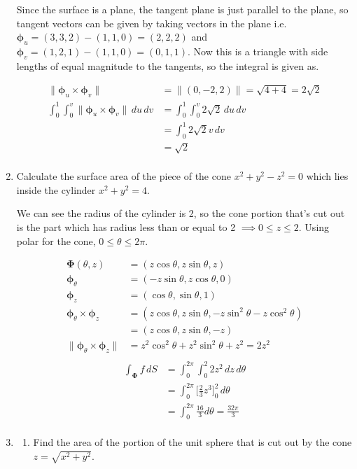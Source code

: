 \documentclass{article}
\newcommand{\norm}[1]{\| #1 \|}
\begin{document}
\begin{enumerate}
    Since the surface is a plane, the tangent plane is just parallel to the plane, so tangent vectors can be given by taking vectors in the plane i.e. $\boldsymbol \phi_u = (3,3,2) - (1,1,0) = (2,2,2)$ and $\boldsymbol \phi_v = (1,2,1) - (1,1,0) = (0,1,1)$. Now this is a triangle with side lengths of equal magnitude to the tangents, so the integral is given as.

    \begin{align*}
        \norm{\boldsymbol \phi_u \times \boldsymbol \phi_v} &= \norm{(0,-2,2)} = \sqrt{4 + 4} = 2 \sqrt2 \\
        \int_0^1 \int_0^v \norm{\boldsymbol \phi_u \times \boldsymbol \phi_v} \, du \, dv &= \int_0^1 \int_0^v 2\sqrt2 \,du \, dv \\
        &= \int_0^1 2\sqrt2v \, dv \\
        &= \sqrt2 \\
    \end{align*}
    \newpage
    \item Calculate the surface area of the piece of the cone $x^2+y^2-z^2 =0$ which lies inside the cylinder $x^2 + y^2 = 4$.
    
    We can see the radius of the cylinder is 2, so the cone portion that's cut out is the part which has radius less than or equal to 2 $\implies 0 \leq z \leq 2$. Using polar for the cone, $0 \leq \theta \leq 2 \pi$.
    \begin{multicols}{2}
    \noindent
    \begin{align*}
        \boldsymbol \Phi (\theta, z) &= (z\cos \theta, z\sin \theta, z) \\
        \boldsymbol \phi_\theta &= (- z \sin \theta, z \cos \theta, 0) \\
        \boldsymbol \phi_z &= ( \cos \theta, \sin \theta, 1) \\
        \boldsymbol \phi_\theta \times \boldsymbol \phi_z &= (z \cos \theta, z \sin \theta, - z \sin^2 \theta - z \cos^2 \theta) \\
        &= (z \cos \theta, z \sin \theta, - z)  \\
        \norm {\boldsymbol \phi_\theta \times \boldsymbol \phi_z }&= z^2 \cos^2 \theta + z^2 \sin^2 \theta + z^2  = 2 z^2\\
    \end{align*}
    \begin{align*}
        \int_{\boldsymbol \Phi} f \, dS &= \int_0^{2\pi} \int_0^2 2z^2 \, dz \, d\theta \\
        &= \int_0^{2\pi} \Big[ \frac{2}{3}z^3\Big]_0^2 \, d\theta \\
        &= \int_0^{2\pi} \frac{16}{3} d\theta =\frac{32\pi}{3} \\
    \end{align*}
    \end{multicols}
    \newpage
    \item
    \begin{enumerate}
        \item Find the area of the portion of the unit sphere that is cut out by the cone $z = \sqrt{x^2+y^2}$.


\end{enumerate}
\end{enumerate}
\end{document}
